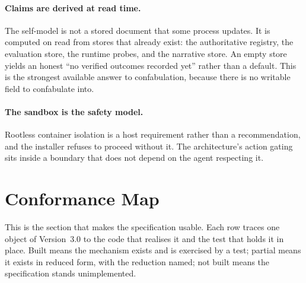 \documentclass[11pt]{article}
\begin{document}
\paragraph{Claims are derived at read time.} The self-model is not a stored document that some process updates. It is computed on read from stores that already exist: the authoritative registry, the evaluation store, the runtime probes, and the narrative store. An empty store yields an honest ``no verified outcomes recorded yet'' rather than a default. This is the strongest available answer to confabulation, because there is no writable field to confabulate into.

\paragraph{The sandbox is the safety model.} Rootless container isolation is a host requirement rather than a recommendation, and the installer refuses to proceed without it. The architecture's action gating sits inside a boundary that does not depend on the agent respecting it.

\section{Conformance Map}
\label{sec:conformance}

This is the section that makes the specification usable. Each row traces one object of Version~3.0 to the code that realises it and the test that holds it in place. \textsf{Built} means the mechanism exists and is exercised by a test; \textsf{partial} means it exists in reduced form, with the reduction named; \textsf{not built} means the specification stands unimplemented.
\end{document}
